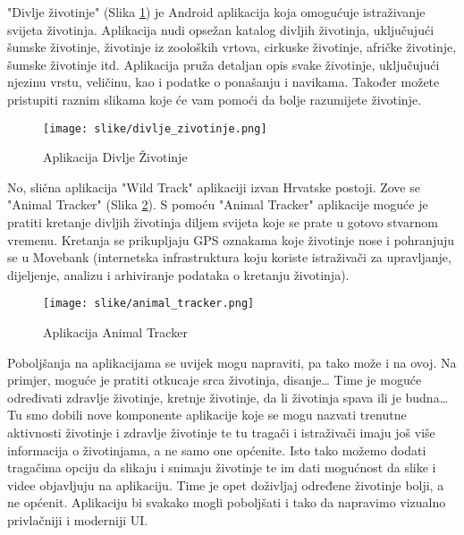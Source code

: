 	"Divlje životinje" (Slika \ref{fig:divlje_zivotinje}) je Android aplikacija koja omogućuje istraživanje svijeta životinja. 
	Aplikacija nudi opsežan katalog divljih životinja, uključujući šumske životinje, životinje iz zooloških vrtova, cirkuske životinje, afričke životinje, šumske životinje itd. 
	Aplikacija pruža detaljan opis svake životinje, uključujući njezinu vrstu, veličinu, kao i podatke o ponašanju i navikama. 
	Također možete pristupiti raznim slikama koje će vam pomoći da bolje razumijete životinje. 

	\begin{figure}[H]
		\texttt{[image: slike/divlje\_zivotinje.png]} %
		\centering
		\caption{Aplikacija Divlje Životinje}
		\label{fig:divlje_zivotinje}
	\end{figure}

	No, slična aplikacija "Wild Track" aplikaciji izvan Hrvatske postoji. Zove se "Animal Tracker" (Slika \ref{fig:animal_tracker}). 
	S pomoću "Animal Tracker" aplikacije moguće je pratiti kretanje divljih životinja diljem svijeta koje se prate u gotovo stvarnom vremenu.
	Kretanja se prikupljaju GPS oznakama koje životinje nose i pohranjuju se u Movebank (internetska infrastruktura koju koriste istraživači za upravljanje, dijeljenje, analizu i arhiviranje podataka o kretanju životinja).


	\begin{figure}[H]
		\texttt{[image: slike/animal\_tracker.png]} %
		\centering
		\caption{Aplikacija Animal Tracker}
		\label{fig:animal_tracker}
	\end{figure}
	

	Poboljšanja na aplikacijama se uvijek mogu napraviti, pa tako može i na ovoj. Na primjer, moguće je pratiti otkucaje srca životinja, disanje\dots 
	Time je moguće određivati zdravlje životinje, kretnje životinje, da li životinja spava ili je budna\dots
	Tu smo dobili nove komponente aplikacije koje se mogu nazvati trenutne aktivnosti životinje i zdravlje životinje te tu tragači i istraživači imaju još više informacija o životinjama, a ne samo one općenite.
	Isto tako možemo dodati tragačima opciju da slikaju i snimaju životinje te im dati mogućnost da slike i videe objavljuju na aplikaciju. Time je opet doživljaj određene životinje bolji, a ne općenit.
	Aplikaciju bi svakako mogli poboljšati i tako da napravimo vizualno privlačniji i moderniji UI.

	